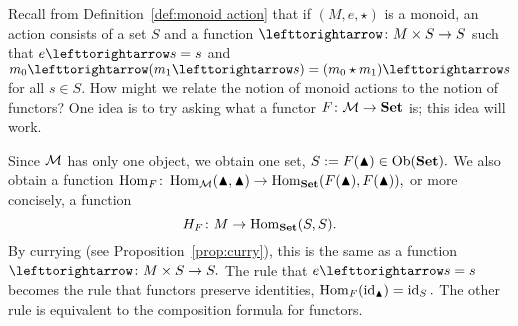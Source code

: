 \documentclass[../main/CT4S-EN-RU]{subfiles}
\begin{document}
\begin{blockRUS}
\end{blockRUS}

\paragraph{} ~\\

\begin{blockENG}
Recall from Definition~\ref{def:monoid action} that if $(M,e,\star)$ is a monoid, an action consists of a set $S$ and a function $\acts\taking M\times S\to S$ such that $e\acts s=s$ and $m_0\acts (m_1\acts s)=(m_0\star m_1)\acts s$ for all $s\in S.$ How might we relate the notion of monoid actions to the notion of functors? One idea is to try asking what a functor $F\colon\mathcal{M}\rightarrow{\mathbf{Set}}$ is; this idea will work.
\end{blockENG}

\begin{blockRUS}
\end{blockRUS}

\begin{blockENG}
Since $\mathcal{M}$ has only one object, we obtain one set, $S:=F(\blacktriangle)\in\operatorname{Ob}({\mathbf{Set}}).$ We also obtain a function $\operatorname{Hom}_F\colon\operatorname{Hom}_\mathcal{M}(\blacktriangle,\blacktriangle)\rightarrow\operatorname{Hom}_{\mathbf{Set}}(F(\blacktriangle),F(\blacktriangle)),$ or more concisely, a function $$H_F\colon M\rightarrow\operatorname{Hom}_{\mathbf{Set}}(S,S).$$ By currying (see Proposition~\ref{prop:curry}), this is the same as a function $\acts\taking M\times S\to S.$ The rule that $e\acts s=s$ becomes the rule that functors preserve identities, $\operatorname{Hom}_F(\operatorname{id}_\blacktriangle)=\operatorname{id}_S.$ The other rule is equivalent to the composition formula for functors. 
\end{blockENG}

\begin{blockRUS}
\end{blockRUS}

\paragraph{} ~\\

\end{document}
